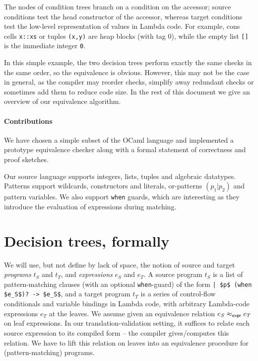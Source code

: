 \documentclass[12pt]{article}
\begin{document}
The nodes of condition trees branch on a condition on the accessor;
source conditions test the head constructor of the accessor, whereas
target conditions test the low-level representation of values in
Lambda code. For example, cons cells \texttt{x::xs} or tuples
\texttt{(x,y)} are heap blocks (with tag 0), while the empty list
\texttt{[]} is the immediate integer \texttt{0}.

In this simple example, the two decision trees perform exactly the
same checks in the same order, so the equivalence is obvious. However,
this may not be the case in general, as the compiler may reorder
checks, simplify away redundant checks or sometimes add them to reduce
code size.
%
In the rest of this document we give an overview of our equivalence
algorithm.


\paragraph{Contributions} We have chosen a simple subset of the OCaml
language and implemented a prototype equivalence checker along with
a formal statement of correctness and proof sketches.

Our source language supports integers, lists, tuples and algebraic
datatypes. Patterns support wildcards, constructors and literals,
or-patterns $(p_1 | p_2)$ and pattern variables.  We also support
\texttt{when} guards, which are interesting as they introduce the
evaluation of expressions during matching.

\section{Decision trees, formally}

We will use, but not define by lack of space, the notion of source and
target \emph{programs} $t_S$ and $t_T$, and \emph{expressions} $e_S$
and $e_T$. A source program $t_S$ is a list of pattern-matching clauses
(with an optional \texttt{when}-guard) of the form
\lstinline{| $p$ (when $e_S$)? -> $e_S$}, and a target program $t_T$ is a series
of control-flow conditionals and variable bindings in Lambda code,
with arbitrary Lambda-code expressions $e_T$ at the leaves.
%
We assume given an equivalence relation $e_S \mathrel{\approx_{\mathsf{expr}}} e_T$ on leaf
expressions. In our translation-validation setting, it suffices to
relate each source expression to its compiled form -- the compiler
gives/computes this relation. We have to lift this relation on leaves
into an equivalence procedure for (pattern-matching) programs.
\end{document}
